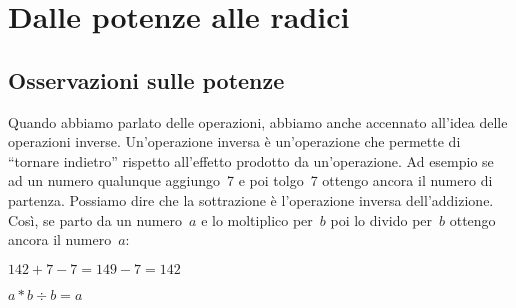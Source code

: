 














\section{Dalle potenze alle radici}
\label{sec:radicali_potenze_radici}

\subsection{Osservazioni sulle potenze}


Quando abbiamo parlato delle operazioni, abbiamo anche accennato all'idea
delle operazioni inverse. Un'operazione inversa è un'operazione che permette
di ``tornare indietro'' rispetto all'effetto prodotto da un'operazione.
Ad esempio se ad un numero qualunque aggiungo~7 e poi tolgo~7 ottengo ancora il 
numero di partenza. Possiamo dire che la sottrazione è l'operazione inversa 
dell'addizione. Così, se parto da un numero~$a$ e lo moltiplico per~$b$ poi lo 
divido per~$b$ ottengo ancora il numero~$a$:

$142 + 7 - 7 = 149 -7 = 142$

$a * b \div b= a$


